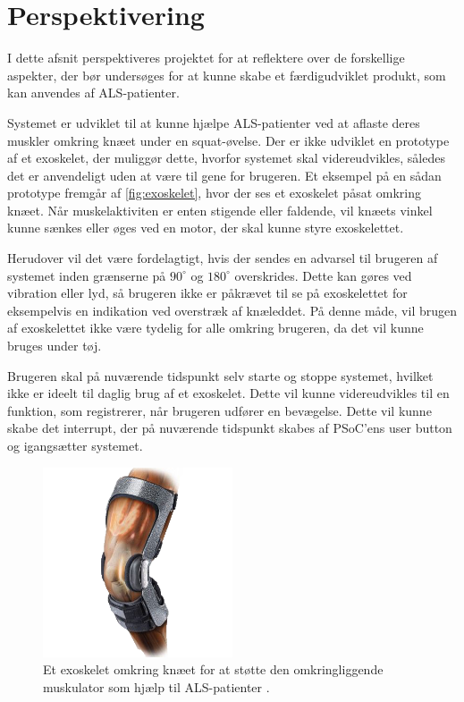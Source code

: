 \section{Perspektivering} \label{sec:perspektivering}
I dette afsnit perspektiveres projektet for at reflektere over de forskellige aspekter, der bør undersøges for at kunne skabe et færdigudviklet produkt, som kan anvendes af ALS-patienter. 

Systemet er udviklet til at kunne hjælpe ALS-patienter ved at aflaste deres muskler omkring knæet under en squat-øvelse. Der er ikke udviklet en prototype af et exoskelet, der muliggør dette, hvorfor systemet skal videreudvikles, således det er anvendeligt uden at være til gene for brugeren. Et eksempel på en sådan prototype fremgår af \autoref{fig:exoskelet}, hvor der ses et exoskelet påsat omkring knæet. Når muskelaktiviten er enten stigende eller faldende, vil knæets vinkel kunne sænkes eller øges ved en motor, der skal kunne styre exoskelettet.

Herudover vil det være fordelagtigt, hvis der sendes en advarsel til brugeren af systemet inden grænserne på $90^{\circ}$ og $180^{\circ}$ overskrides. Dette kan gøres ved vibration eller lyd, så brugeren ikke er påkrævet til se på exoskelettet for eksempelvis en indikation ved overstræk af knæleddet. På denne måde, vil brugen af exoskelettet ikke være tydelig for alle omkring brugeren, da det vil kunne bruges under tøj.

Brugeren skal på nuværende tidspunkt selv starte og stoppe systemet, hvilket ikke er ideelt til daglig brug af et exoskelet. Dette vil kunne videreudvikles til en funktion, som registrerer, når brugeren udfører en bevægelse. Dette vil kunne skabe det interrupt, der på nuværende tidspunkt skabes af PSoC'ens user button og igangsætter systemet. 

\begin{figure}[H]
\centering
\includegraphics[width=0.5\textwidth]{figures/exoskelet}
\caption{Et exoskelet omkring knæet for at støtte den omkringliggende muskulator som hjælp til ALS-patienter \citep{djo}.}
\label{fig:exoskelet}
\end{figure}

